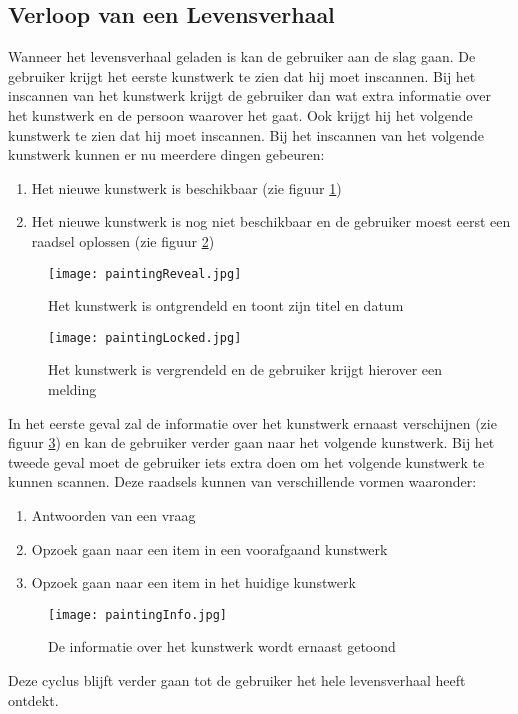 \subsection{Verloop van een Levensverhaal}
Wanneer het levensverhaal geladen is kan de gebruiker aan de slag gaan. De gebruiker krijgt het eerste kunstwerk te zien dat hij moet inscannen. Bij het inscannen van het kunstwerk krijgt de gebruiker dan wat extra informatie over het kunstwerk en de persoon waarover het gaat. Ook krijgt hij het volgende kunstwerk te zien dat hij moet inscannen. Bij het inscannen van het volgende kunstwerk kunnen er nu meerdere dingen gebeuren:

\begin{enumerate}
    \item Het nieuwe kunstwerk is beschikbaar (zie figuur \ref{fig:paintingReveal})
    \item Het nieuwe kunstwerk is nog niet beschikbaar en de gebruiker moest eerst een raadsel oplossen (zie figuur \ref{fig:paintingLocked})
\end{enumerate}
\begin{figure}
    \centering
    \texttt{[image: paintingReveal.jpg]}
    \caption{Het kunstwerk is ontgrendeld en toont zijn titel en datum}
    \label{fig:paintingReveal}
\end{figure}
\begin{figure}
      \centering
    \texttt{[image: paintingLocked.jpg]}
    \caption{Het kunstwerk is vergrendeld en de gebruiker krijgt hierover een melding}
    \label{fig:paintingLocked}
\end{figure}


In het eerste geval zal de informatie over het kunstwerk ernaast verschijnen (zie figuur \ref{fig:paintingInfo}) en kan de gebruiker verder gaan naar het volgende kunstwerk. Bij het tweede geval moet de gebruiker iets extra doen om het volgende kunstwerk te kunnen scannen. Deze raadsels kunnen van verschillende vormen waaronder:

\begin{enumerate}
    \item Antwoorden van een vraag
    \item Opzoek gaan naar een item in een voorafgaand kunstwerk
    \item Opzoek gaan naar een item in het huidige kunstwerk
\end{enumerate}
\begin{figure}
    \centering
    \texttt{[image: paintingInfo.jpg]}
    \caption{De informatie over het kunstwerk wordt ernaast getoond}
    \label{fig:paintingInfo}
\end{figure}
Deze cyclus blijft verder gaan tot de gebruiker het hele levensverhaal heeft ontdekt.

